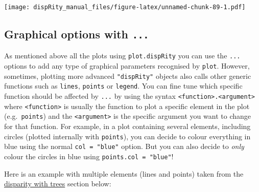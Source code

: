\documentclass[
]{book}
\begin{document}
\texttt{[image: dispRity\_manual\_files/figure-latex/unnamed-chunk-89-1.pdf]}

\hypertarget{graphical-options-with-...}{%
\subsection{\texorpdfstring{Graphical options with \texttt{...}}{Graphical options with ...}}\label{graphical-options-with-...}}

As mentioned above all the plots using \texttt{plot.dispRity} you can use the \texttt{...} options to add any type of graphical parameters recognised by \texttt{plot}.
However, sometimes, plotting more advanced \texttt{"dispRity"} objects also calls other generic functions such as \texttt{lines}, \texttt{points} or \texttt{legend}.
You can fine tune which specific function should be affected by \texttt{...} by using the syntax \texttt{\textless{}function\textgreater{}.\textless{}argument\textgreater{}} where \texttt{\textless{}function\textgreater{}} is usually the function to plot a specific element in the plot (e.g.~\texttt{points}) and the \texttt{\textless{}argument\textgreater{}} is the specific argument you want to change for that function.
For example, in a plot containing several elements, including circles (plotted internally with \texttt{points}), you can decide to colour everything in blue using the normal \texttt{col\ =\ "blue"} option.
But you can also decide to \emph{only} colour the circles in blue using \texttt{points.col\ =\ "blue"}!

Here is an example with multiple elements (lines and points) taken from the \protect\hyperlink{dispRitree}{disparity with trees} section below:
\end{document}
